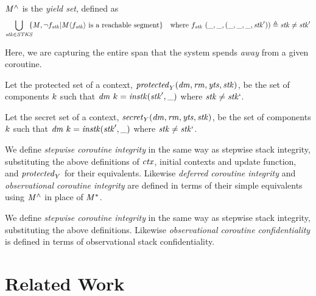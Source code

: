 \documentclass[acmsmall,review,anonymous]{acmart}\settopmatter{printfolios=true,printccs=false,printacmref=false}
\begin{document}
{%

 \(\mathit{M}^\wedge\) is the \emph{yield set}, defined as
\[\begin{aligned}
\bigcup_{\mathit{stk} \in \mathit{STKS}} \hspace{-.5em} \{\mathit{M}, \neg f_{\mathit{stk}} | \mathit{M}\langle f_{\mathit{stk}} \rangle
\text{ is a reachable segment}\} \hspace{1em} &
\text{where } f_{\mathit{stk}} ~ (\mbox{\_},\mbox{\_},(\mbox{\_},\mbox{\_},\mbox{\_},\mathit{stk}')) \triangleq \mathit{stk} \not = \mathit{stk}' \\
\end{aligned}\]

Here, we are capturing the entire span that the system spends {\em away} from a given
coroutine.

Let the protected set of a context, \(\mathit{protected}_Y(\mathit{dm},\mathit{rm},\mathit{yts},\mathit{stk})\),
be the set of components \(k\) such that
\(\mathit{dm} ~ k = \mathit{instk}(\mathit{stk}',\mbox{\_})\) where \(\mathit{stk} \not = \mathit{stk}`\).

Let the secret set of a context, \(\mathit{secret}_Y(\mathit{dm},\mathit{rm},\mathit{yts},\mathit{stk})\),
be the set of components \(k\) such that
\(\mathit{dm} ~ k = \mathit{instk}(\mathit{stk}',\mbox{\_})\) where \(\mathit{stk} \not = \mathit{stk}`\).

We define {\em stepwise coroutine integrity} in the same way as stepwise stack integrity,
substituting the above definitions of \(\mathit{ctx}\), initial contexts and update
function, and \(\mathit{protected}_Y\) for their equivalents. Likewise
{\em deferred coroutine integrity} and {\em observational coroutine integrity} are defined
in terms of their simple equivalents using \(\mathit{M}^\wedge\) in place of \(\mathit{M}^*\).

We define {\em stepwise coroutine integrity} in the same way as stepwise stack
integrity, substituting the above definitions. Likewise
{\em observational coroutine confidentiality} is defined in terms of observational
stack confidentiality.

\section{Related Work}
\label{sec:relwork}

}
\end{document}
